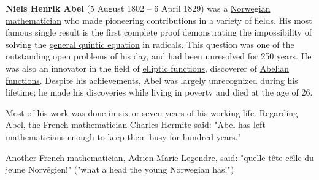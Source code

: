 \documentclass{article}
\begin{document}

\textbf{Niels Henrik Abel} (5 August 1802 -- 6 April 1829) was a \href{https://en.wikipedia.org/wiki/Norwegian}{Norwegian} \href{https://en.wikipedia.org/wiki/Mathematician}{mathematician} who made pioneering contributions in a variety of fields. His most famous single result is the first complete proof demonstrating the impossibility of solving the \href{https://en.wikipedia.org/wiki/Quintic_equation}{general quintic equation} in radicals. This question was one of the outstanding open problems of his day, and had been unresolved for 250 years. He was also an innovator in the field of \href{https://en.wikipedia.org/wiki/Elliptic_function}{elliptic functions}, discoverer of \href{https://en.wikipedia.org/wiki/Abelian_function}{Abelian functions}. Despite his achievements, Abel was largely unrecognized during his lifetime; he made his discoveries while living in poverty and died at the age of 26.

Most of his work was done in six or seven years of his working life.\cite{1} Regarding Abel, the French mathematician \href{https://en.wikipedia.org/wiki/Charles_Hermite}{Charles Hermite} said: "Abel has left mathematicians enough to keep them busy for hundred years.\cite{1}\cite{2}"

\vspace{93.56mm}

Another French mathematician, \href{https://en.wikipedia.org/wiki/Adrien-Marie_Legendre}{Adrien-Marie Legendre}, said: "quelle t\^ete c\^elle du jeune Norv\^egien!" ("what a head the young Norwegian has!")\cite{3}

\vspace{10mm}
\end{document}
